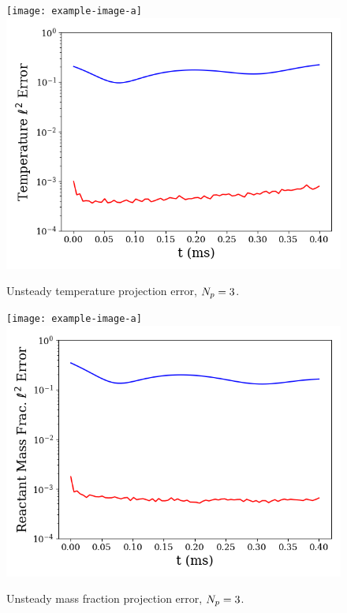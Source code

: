 %
\begin{figure}
    \begin{minipage}{0.45\linewidth}
        \ifdefined\DRAFT
		    \texttt{[image: example-image-a]}
	    \else
		    \includegraphics[width=0.99\linewidth]{Chapters/ProjROMs/Images/temp_error.png}
        \fi
        \caption{\label{fig:projErrTempTime}Unsteady temperature projection error, $N_p = 3$.}
    \end{minipage}
    \hspace{1em}
    \begin{minipage}{0.45\linewidth}
        \ifdefined\DRAFT
		    \texttt{[image: example-image-a]}
	    \else
		    \includegraphics[width=0.99\linewidth]{Chapters/ProjROMs/Images/mf_error.png}
        \fi
        \caption{\label{fig:projErrMFTime}Unsteady mass fraction projection error, $N_p = 3$.}
    \end{minipage}
\end{figure}
%

